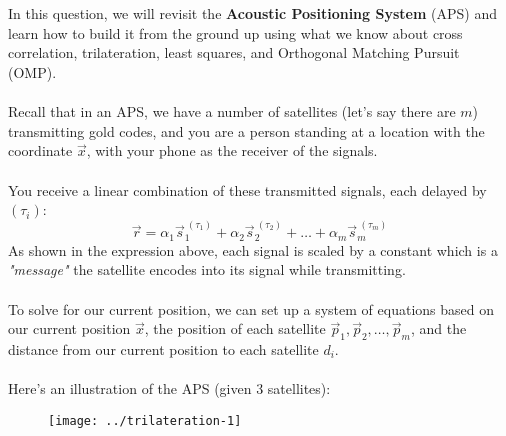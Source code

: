 
\\ \\
In this question, we will revisit the \textbf{Acoustic Positioning System} (APS) and learn how to build it from the ground up using what we know about cross correlation, trilateration, least squares, and Orthogonal Matching Pursuit (OMP).
\\ \\
Recall that in an APS, we have a number of satellites (let's say there are $m$) transmitting gold codes, and you are a person standing at a location with the coordinate $\vec{x}$, with your phone as the receiver of the signals.
\\ \\
You receive a linear combination of these transmitted signals, each delayed by $(\tau_i)$:
$$\vec{r} = \alpha_1 \vec{s}_1^{\ (\tau_1)} + \alpha_2 \vec{s}_2^{\ (\tau_2)} + \hdots + \alpha_m \vec{s}_m^{\ (\tau_m)}$$
As shown in the expression above, each signal is scaled by a constant which is a \textit{"message"} the satellite encodes into its signal while transmitting.
\\ \\
To solve for our current position, we can set up a system of equations based on our current position $\vec{x}$, the position of each satellite $\vec{p}_1, \vec{p}_2, \hdots, \vec{p}_m$, and the distance from our current position to each satellite $d_i$.
\\ \\
Here's an illustration of the APS (given 3 satellites):
\begin{figure}[H]
    \centering
    \texttt{[image: ../trilateration-1]}
\end{figure}

